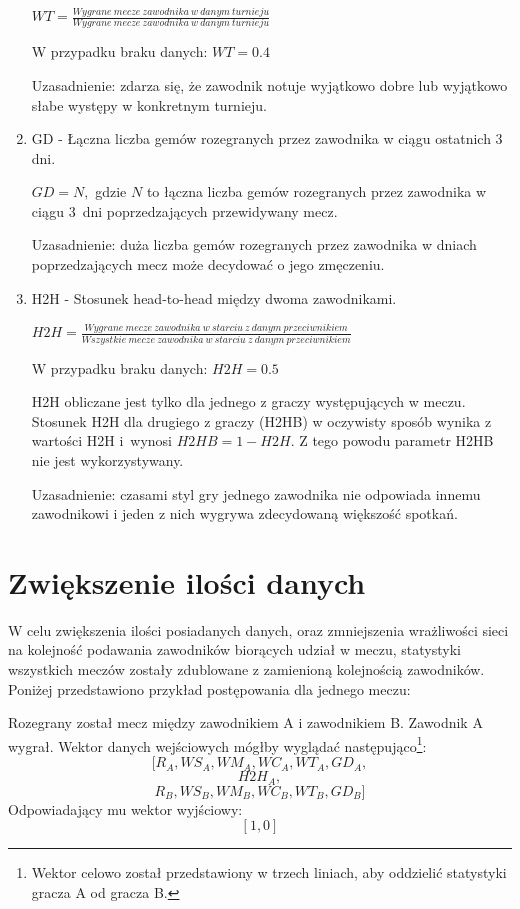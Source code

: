 \begin{enumerate}
$WT = \frac{Wygrane\ mecze\ zawodnika\ w\ danym\ turnieju}{Wygrane\ mecze\ zawodnika\ w\ danym\ turnieju}$

W przypadku braku danych: $WT = 0.4$

Uzasadnienie: zdarza się, że zawodnik notuje wyjątkowo dobre lub wyjątkowo słabe występy w konkretnym turnieju.

\item GD - Łączna liczba gemów rozegranych przez zawodnika w ciągu ostatnich 3 dni.

$GD = N,$ gdzie $N$ to łączna liczba gemów rozegranych przez zawodnika w ciągu 3~dni poprzedzających przewidywany mecz.

Uzasadnienie: duża liczba gemów rozegranych przez zawodnika w dniach poprzedzających mecz może decydować o jego zmęczeniu.

\item H2H - Stosunek head-to-head między dwoma zawodnikami.

$H2H = \frac{Wygrane\ mecze\ zawodnika\ w\ starciu\ z\ danym\ przeciwnikiem}{Wszystkie\ mecze\ zawodnika\ w\ starciu\ z\ danym\ przeciwnikiem}$

W przypadku braku danych: $H2H = 0.5$

H2H obliczane jest tylko dla jednego z graczy występujących w meczu. Stosunek H2H dla drugiego z graczy (H2HB) w oczywisty sposób wynika z wartości H2H i~wynosi $H2HB = 1 - H2H$. Z tego powodu parametr H2HB nie jest wykorzystywany.

Uzasadnienie: czasami styl gry jednego zawodnika nie odpowiada innemu zawodnikowi i jeden z nich wygrywa zdecydowaną większość spotkań.

\end{enumerate}

\section{Zwiększenie ilości danych}
\label{Sec:DataDouble}

W celu zwiększenia ilości posiadanych danych, oraz zmniejszenia wrażliwości sieci na kolejność podawania zawodników biorących udział w meczu, statystyki wszystkich meczów zostały zdublowane z zamienioną kolejnością zawodników. Poniżej przedstawiono przykład postępowania dla jednego meczu:

Rozegrany został mecz między zawodnikiem A i zawodnikiem B. Zawodnik A wygrał. Wektor danych wejściowych mógłby wyglądać następująco\footnote{Wektor celowo został przedstawiony w trzech liniach, aby oddzielić statystyki gracza A od gracza B.}: $$[R_A, WS_A, WM_A, WC_A, WT_A, GD_A,$$
$$H2H_A,$$  
$$R_B, WS_B, WM_B, WC_B, WT_B, GD_B]$$
Odpowiadający mu wektor wyjściowy: $$[1, 0]$$

